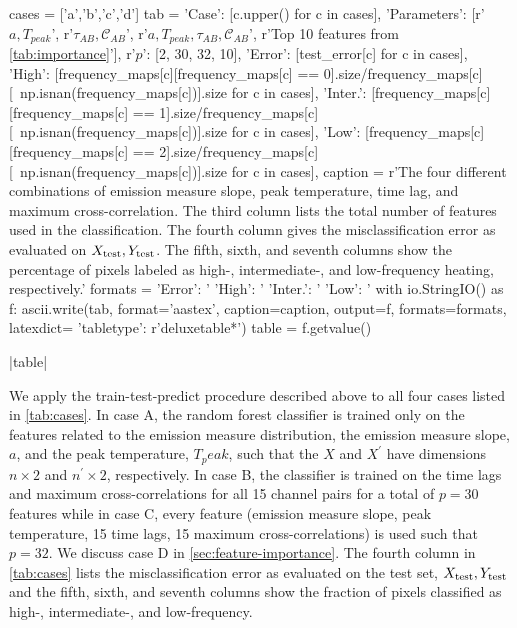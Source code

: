 \begin{pycode}[manager_ml]
cases = ['a','b','c','d']
tab = {
    'Case': [c.upper() for c in cases],
    'Parameters': [r'$a,T_{peak}$', r'$\tau_{AB},\mathcal{C}_{AB}$', r'$a,T_{peak},\tau_{AB},\mathcal{C}_{AB}$', r'Top 10 features from \autoref{tab:importance}'],
    r'$p$': [2, 30, 32, 10],
    'Error': [test_error[c] for c in cases],
    'High': [frequency_maps[c][frequency_maps[c] == 0].size/frequency_maps[c][~np.isnan(frequency_maps[c])].size for c in cases],
    'Inter.': [frequency_maps[c][frequency_maps[c] == 1].size/frequency_maps[c][~np.isnan(frequency_maps[c])].size for c in cases],
    'Low': [frequency_maps[c][frequency_maps[c] == 2].size/frequency_maps[c][~np.isnan(frequency_maps[c])].size for c in cases],
}
caption = r'The four different combinations of emission measure slope, peak temperature, time lag, and maximum cross-correlation. The third column lists the total number of features used in the classification. The fourth column gives the misclassification error as evaluated on $X_\textup{test},Y_\textup{test}$. The fifth, sixth, and seventh columns show the percentage of pixels labeled as high-, intermediate-, and low-frequency heating, respectively.\label{tab:cases}'
formats = {
    'Error': '%
    'High': '%
    'Inter.': '%
    'Low': '%
}
with io.StringIO() as f:
    ascii.write(tab, format='aastex', caption=caption, output=f, formats=formats, latexdict={ 'tabletype': r'deluxetable*'})
    table = f.getvalue()
\end{pycode}
\py[manager_ml]|table|

We apply the train-test-predict procedure described above to all four cases listed in \autoref{tab:cases}.
In case A, the random forest classifier is trained only on the features related to the emission measure distribution, the emission measure slope, $a$, and the peak temperature, $T_peak$, such that the $X$ and $X^\prime$ have dimensions $n\times2$ and $n^\prime\times2$, respectively.
In case B, the classifier is trained on the time lags and maximum cross-correlations for all 15 channel pairs for a total of $p=30$ features while in case C, every feature (emission measure slope, peak temperature, 15 time lags, 15 maximum cross-correlations) is used such that $p=32$.
We discuss case D in \autoref{sec:feature-importance}.
The fourth column in \autoref{tab:cases} lists the misclassification error as evaluated on the test set, $X_\textup{test},Y_\textup{test}$ and the fifth, sixth, and seventh columns show the fraction of pixels classified as high-, intermediate-, and low-frequency.

